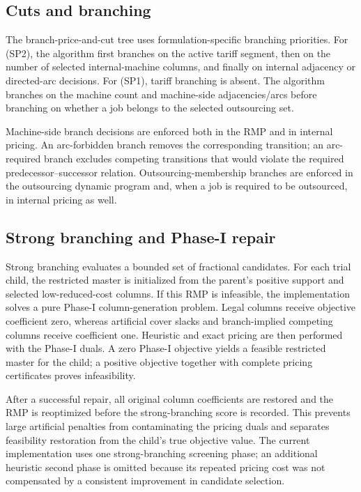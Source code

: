 \subsection{Cuts and branching}
\label{subsec:cuts-branching}

The branch-price-and-cut tree uses formulation-specific branching priorities. For
\textup{(SP2)}, the algorithm first branches on the active tariff segment,
then on the number of selected internal-machine columns, and finally on internal
adjacency or directed-arc decisions. For \textup{(SP1)}, tariff branching
is absent. The algorithm branches on the machine count and machine-side
adjacencies/arcs before branching on whether a job belongs to the selected
outsourcing set.

Machine-side branch decisions are enforced both in the RMP and in internal
pricing. An arc-forbidden branch removes the corresponding transition; an
arc-required branch excludes competing transitions that would violate the required
predecessor--successor relation. Outsourcing-membership branches are enforced in
the outsourcing dynamic program and, when a job is required to be outsourced, in
internal pricing as well.

\subsection{Strong branching and Phase-I repair}
\label{subsec:strong-branching}

Strong branching evaluates a bounded set of fractional candidates. For each trial
child, the restricted master is initialized from the parent's positive support and
selected low-reduced-cost columns. If this RMP is infeasible, the implementation
solves a pure Phase-I column-generation problem. Legal columns receive objective
coefficient zero, whereas artificial cover slacks and branch-implied competing
columns receive coefficient one. Heuristic and exact pricing are then performed
with the Phase-I duals. A zero Phase-I objective yields a feasible restricted
master for the child; a positive objective together with complete pricing
certificates proves infeasibility.

After a successful repair, all original column coefficients are restored and the
RMP is reoptimized before the strong-branching score is recorded. This prevents
large artificial penalties from contaminating the pricing duals and separates
feasibility restoration from the child's true objective value. The current
implementation uses one strong-branching screening phase; an additional heuristic
second phase is omitted because its repeated pricing cost was not compensated by
a consistent improvement in candidate selection.

